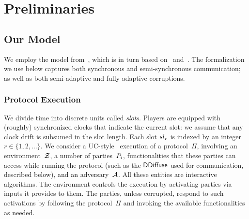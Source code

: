 \section{Preliminaries}



\subsection{Our Model}
\label{sec:model}

We employ the model from~\cite{EC:DGKR18}, which is in turn based
on~\cite{C:KRDO17} and~\cite{EC:GarKiaLeo15}.
The formalization we use below captures both synchronous and semi-syn\-chronous
communication; as well as both semi-adaptive and fully adaptive corruptions.

\subsubsection{Protocol Execution}
\label{sec:prelim-exec}

We divide time into discrete units called
\emph{slots}. %
Players are equipped with (roughly) synchronized clocks that
indicate the current slot: we assume that any clock drift is subsumed in the
slot length.  Each slot $sl_r$ is indexed by an integer $r \in \{1,2,\ldots
\}$.
We consider a UC-style~\cite{FOCS:Canetti01} execution of a protocol~$\Pi$,
involving an environment~$\mathcal{Z}$, a number of
parties~$P_i$, functionalities that these parties can access while running
the protocol (such as the $\mathsf{DDiffuse}$ used for communication, described below), and
an adversary~$\mathcal{A}$. All these entities are interactive algorithms.  The
environment controls the execution by activating parties via inputs it provides
to them. The parties, unless corrupted, respond to such activations by following
the protocol~$\Pi$ and invoking the available functionalities as needed.

